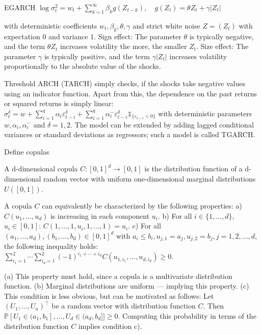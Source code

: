 EGARCH
\(
\log \sigma_t^2 = w_t + \sum_{k=1}^{\infty} \beta_k g(Z_{t-k}), \quad g(Z_t) = \theta Z_t + \gamma |Z_t|
\)

with deterministic coefficients \( w_t, \beta_k, \theta, \gamma \) and strict white noise \( Z = (Z_t) \) with expectation 0 and variance 1.
Sign effect:  
The parameter \( \theta \) is typically negative, and the term \( \theta Z_t \) increases volatility the more, the smaller \( Z_t \).
Size effect:  
The parameter \( \gamma \) is typically positive, and the term \( \gamma |Z_t| \) increases volatility proportionally 
to the absolute value of the shocks.

Threshold ARCH (TARCH) simply checks, if the shocks take negative values using an indicator function. 
Apart from this, the dependence on the past returns or squared returns is simply linear:
\(
\sigma_t^{\delta} = w + \sum_{i=1}^{q} \alpha_i \varepsilon_{t-i}^{\delta} + \sum_{i=1}^{q} \alpha_i^{-} \varepsilon_{t-i}^{\delta} \mathbb{1}_{\{\varepsilon_{t-i}<0\}}
\)
with deterministic parameters \( w, \alpha_i, \alpha_i^{-} \) and \( \delta = 1,2 \).
The model can be extended by adding lagged conditional variances or standard deviations as regressors; such a model is called TGARCH.




Define copulas


A d-dimensional copula \(C : [0, 1]^d \rightarrow [0, 1]\) is the distribution function of a d-dimensional random vector 
with uniform one-dimensional marginal distributions \(U([0,1])\).

A copula \(C\) can equivalently be characterized by the following properties:
a) \(C(u_1, \ldots, u_d)\) is increasing in each component \(u_i\).
b) For all \(i \in \{1, \ldots, d\}\), \(u_i \in [0, 1]\): \(C(1, \ldots, 1, u_i, 1, \ldots, 1) = u_i\).
c) For all \((a_1, \ldots, a_d), (b_1, \ldots, b_d) \in [0, 1]^d\) with \(a_i \leq b_i, u_{j,1} = a_j, u_{j,2} = b_j, j = 1, 2, \ldots, d\), the following inequality holds:
\(
\sum_{i_1=1}^2 \cdots \sum_{i_d=1}^2 (-1)^{i_1 + \cdots + i_d} C(u_{1, i_1}, \ldots, u_{d, i_d}) \geq 0.
\)


(a) This property must hold, since a copula is a multivariate distribution function.
(b) Marginal distributions are uniform — implying this property.
(c) This condition is less obvious, but can be motivated as follows:
Let \((U_1, \ldots, U_n)^\top\) be a random vector with distribution function \(C\). Then
\(
\mathbb{P}[U_1 \in (a_1, b_1], \ldots, U_d \in (a_d, b_d]] \geq 0.
\)
Computing this probability in terms of the distribution function \(C\) implies condition c).


